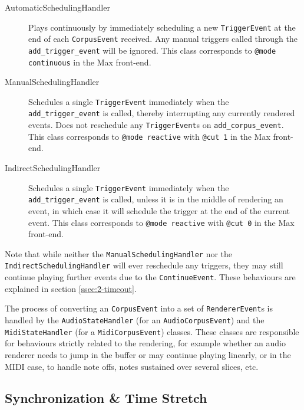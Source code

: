 \begin{description}
	\item[AutomaticSchedulingHandler] Plays continuously by immediately scheduling a new \texttt{TriggerEvent} at the end of each \texttt{CorpusEvent} received. Any manual triggers called through the \texttt{add\_trigger\_event} will be ignored. This class corresponds to \texttt{@mode continuous} in the Max front-end.
	\item[ManualSchedulingHandler] Schedules a single \texttt{TriggerEvent} immediately when the \texttt{add\_trigger\_event} is called, thereby interrupting any currently rendered events. Does not reschedule any \texttt{TriggerEvent}s on \texttt{add\_corpus\_event}. This class corresponds to \texttt{@mode reactive} with \texttt{@cut 1} in the Max front-end.
	\item[IndirectSchedulingHandler] Schedules a single \texttt{TriggerEvent} immediately when the \texttt{add\_trigger\_event} is called, unless it is in the middle of rendering an event, in which case it will schedule the trigger at the end of the current event. This class corresponds to \texttt{@mode reactive} with \texttt{@cut 0} in the Max front-end.
\end{description}
Note that while neither the \texttt{ManualSchedulingHandler} nor the \\ \texttt{IndirectSchedulingHandler} will ever reschedule any triggers, they may still continue playing further events due to the \texttt{ContinueEvent}. These behaviours are explained in section \ref{ssec:2-timeout}.

The process of converting an \texttt{CorpusEvent} into a set of \texttt{RendererEvent}s is handled by the \texttt{AudioStateHandler} (for an \texttt{AudioCorpusEvent}) and the \texttt{MidiStateHandler} (for a \texttt{MidiCorpusEvent}) classes. These classes are responsible for behaviours strictly related to the rendering, for example whether an audio renderer needs to jump in the buffer or may continue playing linearly, or in the MIDI case, to handle note offs, notes sustained over several slices, etc.




\subsection{Synchronization \& Time Stretch}\label{ssec:2-time-stretch}

